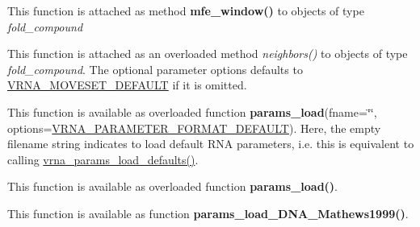 \begin{DoxyRefList}
%
 This function is attached as method {\bfseries{mfe\+\_\+window()}} to objects of type {\itshape fold\+\_\+compound}  
\item[Global \mbox{\hyperlink{group__neighbors_ga4f8eefae08c05f5a49a4d4ee5d02e32f}{vrna\+\_\+neighbors}} (vrna\+\_\+fold\+\_\+compound\+\_\+t $\ast$vc, const short $\ast$pt, unsigned int options)]\label{wrappers__wrappers000093}%
%
 This function is attached as an overloaded method {\itshape neighbors()} to objects of type {\itshape fold\+\_\+compound}. The optional parameter {\ttfamily options} defaults to \mbox{\hyperlink{group__neighbors_gaa5ffec4dd0d02df320f123e6888154d1}{V\+R\+N\+A\+\_\+\+M\+O\+V\+E\+S\+E\+T\+\_\+\+D\+E\+F\+A\+U\+LT}} if it is omitted.  
\item[Global \mbox{\hyperlink{group__energy__parameters__rw_gabb0583595c67094986ef90cb4f1c7555}{vrna\+\_\+params\+\_\+load}} (const char fname\mbox{[}\mbox{]}, unsigned int options)]\label{wrappers__wrappers000098}%
%
 This function is available as overloaded function {\bfseries{params\+\_\+load}}(fname=\char`\"{}\char`\"{}, options=\mbox{\hyperlink{group__energy__parameters__rw_ga2d46720ac5bf0e56ce0dbbff459667d2}{V\+R\+N\+A\+\_\+\+P\+A\+R\+A\+M\+E\+T\+E\+R\+\_\+\+F\+O\+R\+M\+A\+T\+\_\+\+D\+E\+F\+A\+U\+LT}}). Here, the empty filename string indicates to load default R\+NA parameters, i.\+e. this is equivalent to calling \mbox{\hyperlink{group__energy__parameters__rw_ga413bc688695c9a707dbcc678412d6792}{vrna\+\_\+params\+\_\+load\+\_\+defaults()}}.  
\item[Global \mbox{\hyperlink{group__energy__parameters__rw_ga413bc688695c9a707dbcc678412d6792}{vrna\+\_\+params\+\_\+load\+\_\+defaults}} (void)]\label{wrappers__wrappers000101}%
%
 This function is available as overloaded function {\bfseries{params\+\_\+load()}}.  
\item[Global \mbox{\hyperlink{group__energy__parameters__rw_ga4d897130a700f86b7d4035a95f25615a}{vrna\+\_\+params\+\_\+load\+\_\+\+D\+N\+A\+\_\+\+Mathews1999}} (void)]\label{wrappers__wrappers000108}%
%
 This function is available as function {\bfseries{params\+\_\+load\+\_\+\+D\+N\+A\+\_\+\+Mathews1999()}}.  
\item[Global \mbox{\hyperlink{group__energy__parameters__rw_gafa45b5734355baa634ca0a2e2857563e}{vrna\+\_\+params\+\_\+load\+\_\+\+D\+N\+A\+\_\+\+Mathews2004}} (void)]\label{wrappers__wrappers000107}%

\end{DoxyRefList}
